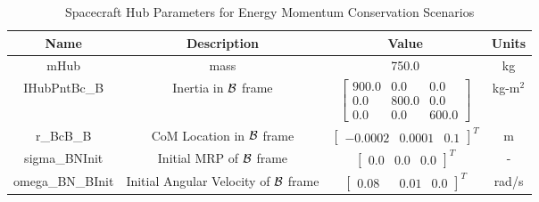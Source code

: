 \begin{table}[htbp]
	\caption{Spacecraft Hub Parameters for Energy Momentum Conservation Scenarios}
	\label{tab:hub}
	\centering \fontsize{10}{10}\selectfont
	\begin{tabular}{ c | c | c | c } %
		\hline
		\textbf{Name}  & \textbf{Description}  & \textbf{Value} & \textbf{Units} \\
		\hline
		mHub  & mass & 750.0 & kg \\
		IHubPntBc\_B & Inertia in $\cal{B}$ frame & $\begin{bmatrix}
		900.0 & 0.0 & 0.0\\
		0.0 & 800.0 & 0.0\\
		0.0 & 0.0 & 600.0
		\end{bmatrix}$ & kg-m$^2$ \\
		r\_BcB\_B & CoM Location in $\cal{B}$ frame & $\begin{bmatrix}
		-0.0002 & 0.0001 & 0.1 \end{bmatrix}^T$ & m \\
		sigma\_BNInit & Initial MRP of $\cal{B}$ frame & $\begin{bmatrix}
		0.0 & 0.0 & 0.0
		\end{bmatrix}^T$ & - \\
		omega\_BN\_BInit & Initial Angular Velocity of $\cal{B}$ frame & $			
		\begin{bmatrix}
		0.08 & & 0.01 & 0.0
		\end{bmatrix}^T$ & rad/s \\
		\hline
	\end{tabular}
\end{table}

